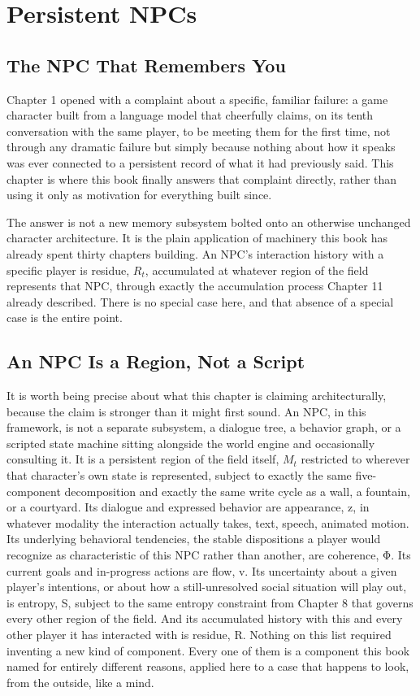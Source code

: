 \chapter{Persistent NPCs}

\section{The NPC That Remembers You}

Chapter 1 opened with a complaint about a specific, familiar failure: a game character built from a language model that cheerfully claims, on its tenth conversation with the same player, to be meeting them for the first time, not through any dramatic failure but simply because nothing about how it speaks was ever connected to a persistent record of what it had previously said. This chapter is where this book finally answers that complaint directly, rather than using it only as motivation for everything built since.

The answer is not a new memory subsystem bolted onto an otherwise unchanged character architecture. It is the plain application of machinery this book has already spent thirty chapters building. An NPC's interaction history with a specific player is residue, \(R_t\), accumulated at whatever region of the field represents that NPC, through exactly the accumulation process Chapter 11 already described. There is no special case here, and that absence of a special case is the entire point.

\section{An NPC Is a Region, Not a Script}

It is worth being precise about what this chapter is claiming architecturally, because the claim is stronger than it might first sound. An NPC, in this framework, is not a separate subsystem, a dialogue tree, a behavior graph, or a scripted state machine sitting alongside the world engine and occasionally consulting it. It is a persistent region of the field itself, \(M_t\) restricted to wherever that character's own state is represented, subject to exactly the same five-component decomposition and exactly the same write cycle as a wall, a fountain, or a courtyard. Its dialogue and expressed behavior are appearance, z, in whatever modality the interaction actually takes, text, speech, animated motion. Its underlying behavioral tendencies, the stable dispositions a player would recognize as characteristic of this NPC rather than another, are coherence, Φ. Its current goals and in-progress actions are flow, v. Its uncertainty about a given player's intentions, or about how a still-unresolved social situation will play out, is entropy, S, subject to the same entropy constraint from Chapter 8 that governs every other region of the field. And its accumulated history with this and every other player it has interacted with is residue, R. Nothing on this list required inventing a new kind of component. Every one of them is a component this book named for entirely different reasons, applied here to a case that happens to look, from the outside, like a mind.

